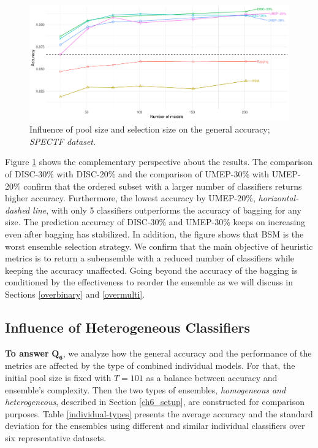 \begin{figure}[!ht]
\centering
\includegraphics[width=1\textwidth]{6_analysis/fig/Selection.pdf}
\caption{Influence of pool size and selection size on the general accuracy; \textit{SPECTF dataset}.}
\label{Selection-size}
\end{figure}




Figure \ref{Selection-size} shows the complementary perspective about the results. The comparison of DISC-30\% with DISC-20\% and the comparison of UMEP-30\% with UMEP-20\% confirm that the ordered subset with a larger number of classifiers returns higher accuracy. Furthermore, the lowest accuracy by UMEP-20\%, \textit{horizontal-dashed line}, with only 5 classifiers outperforms the accuracy of bagging for any size. The prediction accuracy of DISC-30\% and UMEP-30\% keeps on increasing even after bagging has stabilized. In addition, the figure shows that BSM is the worst ensemble selection strategy. We confirm that the main objective of heuristic metrics is to return a subensemble with a reduced number of classifiers while keeping the accuracy unaffected. Going beyond the accuracy of the bagging is conditioned by the effectiveness to reorder the ensemble as we will discuss in Sections \ref{overbinary} and \ref{overmulti}.   



\subsection{Influence of Heterogeneous Classifiers} \label{heter.class}

\textbf{To answer} $\pmb{Q_6}$, we analyze how the general accuracy and the performance of the metrics are affected by the type of combined individual models. For that, the initial pool size is fixed with $T=101$ as a balance between accuracy and ensemble's complexity. Then the two types of ensembles, \textit{homogeneous and heterogeneous}, described in Section \ref{ch6_setup}, are constructed for comparison purposes. Table \ref{individual-types} presents the average accuracy and the standard deviation for the ensembles using different and similar individual classifiers over six representative datasets. 

